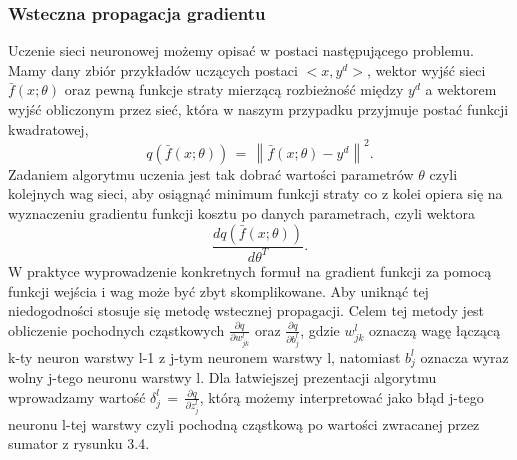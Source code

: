 \subsubsection{Wsteczna propagacja gradientu}
Uczenie sieci neuronowej możemy opisać w postaci następującego problemu. Mamy dany zbiór przykładów uczących postaci \(<x,y^d> \), wektor wyjść sieci \(\bar{f}(x;\theta)\) oraz pewną funkcje straty mierzącą rozbieżność między \(y^d \) a wektorem wyjść obliczonym przez sieć, która w naszym przypadku przyjmuje postać funkcji kwadratowej, 
\begin{equation}
q(\bar{f}(x;\theta)) \, = \, \left\| \bar{f}(x;\theta) - y^d \right\|^2. 
\end{equation}
Zadaniem algorytmu uczenia jest tak dobrać wartości parametrów \( \theta \) czyli kolejnych wag sieci, aby osiągnąć minimum funkcji straty co z kolei opiera się na wyznaczeniu gradientu funkcji kosztu po danych parametrach, czyli wektora
\begin{equation}
\frac{dq(\bar{f}(x;\theta))}{d\theta^T}. 
\end{equation}
W praktyce wyprowadzenie konkretnych formuł na gradient funkcji za pomocą funkcji wejścia i wag może być zbyt skomplikowane. Aby uniknąć tej niedogodności stosuje się metodę wstecznej propagacji. Celem tej metody jest obliczenie pochodnych cząstkowych \( \frac{\partial q}{\partial w_{jk}^l} \) oraz \( \frac{\partial q}{\partial b_j^l} \), gdzie \( w_{jk}^l \) oznaczą wagę łączącą k-ty neuron warstwy l-1 z j-tym neuronem warstwy l, natomiast \(b_{j}^l\) oznacza wyraz wolny j-tego neuronu warstwy l. Dla łatwiejszej prezentacji algorytmu wprowadzamy wartość \( \delta_j^l \, = \, \frac{\partial q}{\partial z_j^l} \), którą możemy interpretować jako błąd j-tego neuronu l-tej warstwy czyli pochodną cząstkową po wartości zwracanej przez sumator z rysunku 3.4. 

